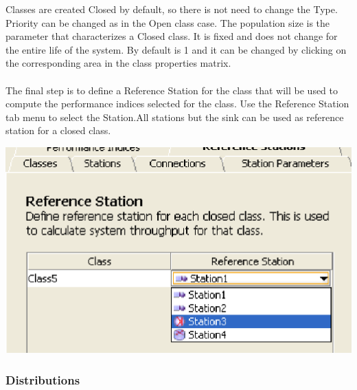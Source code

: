 Classes are created Closed by default, so there is not need to change the Type. Priority can be changed as in the Open class case. The population size is the parameter that characterizes a Closed class. It is fixed and does not change for the entire life of the system. By default is 1 and it can be changed by clicking on the corresponding area in the class properties matrix.\\\\
The final step is to define a Reference Station for the class that will be used to compute the performance indices selected for the class. Use the Reference Station tab menu to select the Station.All stations but the sink can be used as reference station for a closed class.\\
\begin{center}
\includegraphics[scale=.5]{img/jsim/reference_closed1.eps}
\end{center}

\subsubsection{Distributions}
\label{sec:Distributions}

